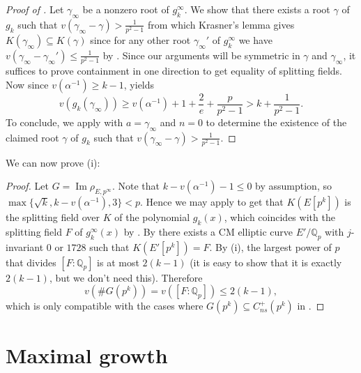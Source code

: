 \documentclass{amsart}
\theoremstyle{definition}
\newcommand{\Q}{\mathbb{Q}}
\numberwithin{theorem}{section}
\numberwithin{equation}{section}
\begin{document}
\begin{proof}[Proof of ]
Let $\gamma_{\infty}$ be a nonzero root of $g_k^{\infty}$. We show that there exists a root $\gamma$ of $g_k$ such that $v(\gamma_\infty-\gamma)> \frac{1}{p^2-1}$ from which Krasner's lemma gives $K(\gamma_{\infty}) \subseteq K(\gamma)$ since for any other root $\gamma_\infty'$ of $g_k^\infty$ we have $v(\gamma_\infty - \gamma_\infty') \leq \frac{1}{p^2-1}$ by . Since our arguments will be symmetric in $\gamma$ and $\gamma_\infty$, it suffices to prove containment in one direction to get equality of splitting fields. 
Now since $v(\alpha^{-1})\geq k-1$,  yields
\[
v(g_k(\gamma_\infty)) \geq v(\alpha^{-1}) + 1 + \frac{2}{e} + \frac{p}{p^2-1}
 > k + \frac{1}{p^2-1}.
\]
To conclude, we apply  with $a=\gamma_\infty$ and $n=0$ to determine the existence of the claimed root $\gamma$ of $g_k$ such that $v(\gamma_\infty-\gamma)> \frac{1}{p^2-1}$.

\end{proof}


We can now prove (i):

\begin{proof}
Let $G=\operatorname{Im} \rho_{E, p^\infty}$. Note that $k-v(\alpha^{-1})-1 \leq 0$ by assumption, so $\max\{\sqrt{k}, k-v(\alpha^{-1}), 3 \} <p$. Hence we may apply  to get that $K(E[p^k])$ is the splitting field over $K$ of the polynomial $g_k(x)$, which coincides with the splitting field $F$ of $g_k^{\infty}(x)$ by . By  there exists a CM elliptic curve $E'/\Q_p$ with $j$-invariant $0$ or $1728$ such that $K(E'[p^k])=F$. By (i), the largest power of $p$ that divides $[F : \Q_p]$ is at most $2(k-1)$ (it is easy to show that it is exactly $2(k-1)$, but we don't need this). Therefore
\[
v(\#G(p^k)) = v([F:\Q_p]) \leq 2(k-1),
\]
which is only compatible with the cases where $G(p^k) \subseteq C_{ns}^+(p^k)$ in .
\end{proof}


\section{Maximal growth}\label{sect: valuation zero}
\end{document}
